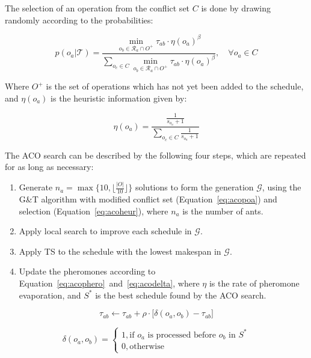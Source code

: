 \documentclass[paper=a4, fontsize=9pt]{scrartcl}
\begin{document}
\begin{multicols}{2}
The selection of an operation from the conflict set $C$ is done by drawing randomly according to the probabilities:

\begin{equation}
p(o_a \vert \mathcal{T}) = \frac
{
    \min_{o_b \in \mathcal{R}_a \cap O^{+}} \tau_{ab} \cdot \eta(o_a)^\beta
}
{
    \sum_{o_c \in C} \min_{o_b \in \mathcal{R}_a \cap O^{+}} \tau_{ab} \cdot \eta(o_a)^\beta
}, \quad \forall o_a \in C
\label{eq:acopoa}
\end{equation}

Where $O^{+}$ is the set of operations which has not yet been added to the schedule, and $\eta(o_a)$ is the heuristic information given by:

\begin{equation}
\eta(o_a) = \frac
{
    \frac{1}{s_{o_a} + 1}
}
{
    \sum_{o_c \in C} \frac{1}{s_{o_a} + 1}
}
\label{eq:acoheur}
\end{equation}

The \ac{ACO} search can be described by the following four steps, which are repeated for as long as necessary:

\begin{enumerate}
    \item Generate $n_a = \max \Big\{ 10, \big\lfloor \frac{\vert O \vert}{10} \big\rfloor \Big\}$ solutions to form the generation $\mathcal{G}$, using the G\&T algorithm with modified conflict set (Equation~\ref{eq:acopoa}) and selection (Equation~\ref{eq:acoheur}), where $n_a$ is the number of ants.
    \item Apply local search to improve each schedule in $\mathcal{G}$.
    \item Apply \ac{TS} to the schedule with the lowest makespan in $\mathcal{G}$.
    \item Update the pheromones according to Equation~\ref{eq:acophero}~and~\ref{eq:acodelta}, where $\eta$ is the rate of pheromone evaporation, and $S^{*}$ is the best schedule found by the \ac{ACO} search.
\end{enumerate}

\begin{equation}
\tau_{ab} \gets \tau_{ab} + \rho \cdot \big[ \delta(o_a, o_b) - \tau_{ab} \big]
\label{eq:acophero}
\end{equation}

\begin{equation}
\delta(o_a, o_b) =
\begin{cases}
1, \text{if $o_a$ is processed before $o_b$ in $S^{*}$}\\
0, \text{otherwise}
\end{cases}
\label{eq:acodelta}
\end{equation}


\end{multicols}
\end{document}
